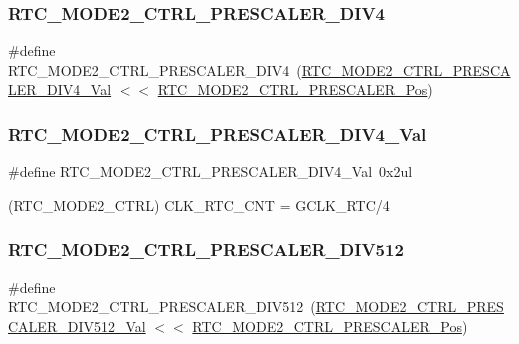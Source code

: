 \subsubsection{\texorpdfstring{RTC\_MODE2\_CTRL\_PRESCALER\_DIV4}{RTC\_MODE2\_CTRL\_PRESCALER\_DIV4}}
{\footnotesize\ttfamily \#define R\+T\+C\+\_\+\+M\+O\+D\+E2\+\_\+\+C\+T\+R\+L\+\_\+\+P\+R\+E\+S\+C\+A\+L\+E\+R\+\_\+\+D\+I\+V4~(\mbox{\hyperlink{group___s_a_m_d21___r_t_c_ga7075835115eb6138d8a729068575f7c8}{R\+T\+C\+\_\+\+M\+O\+D\+E2\+\_\+\+C\+T\+R\+L\+\_\+\+P\+R\+E\+S\+C\+A\+L\+E\+R\+\_\+\+D\+I\+V4\+\_\+\+Val}} $<$$<$ \mbox{\hyperlink{group___s_a_m_d21___r_t_c_gab49acaac9629f089845263f149b8a6c0}{R\+T\+C\+\_\+\+M\+O\+D\+E2\+\_\+\+C\+T\+R\+L\+\_\+\+P\+R\+E\+S\+C\+A\+L\+E\+R\+\_\+\+Pos}})}

\mbox{\label{group___s_a_m_d21___r_t_c_ga7075835115eb6138d8a729068575f7c8}} 
\subsubsection{\texorpdfstring{RTC\_MODE2\_CTRL\_PRESCALER\_DIV4\_Val}{RTC\_MODE2\_CTRL\_PRESCALER\_DIV4\_Val}}
{\footnotesize\ttfamily \#define R\+T\+C\+\_\+\+M\+O\+D\+E2\+\_\+\+C\+T\+R\+L\+\_\+\+P\+R\+E\+S\+C\+A\+L\+E\+R\+\_\+\+D\+I\+V4\+\_\+\+Val~0x2ul}



(R\+T\+C\+\_\+\+M\+O\+D\+E2\+\_\+\+C\+T\+RL) C\+L\+K\+\_\+\+R\+T\+C\+\_\+\+C\+NT = G\+C\+L\+K\+\_\+\+R\+T\+C/4 

\mbox{\label{group___s_a_m_d21___r_t_c_ga7ae90cb3eb6497c6e0c22c3269e2c83d}} 
\subsubsection{\texorpdfstring{RTC\_MODE2\_CTRL\_PRESCALER\_DIV512}{RTC\_MODE2\_CTRL\_PRESCALER\_DIV512}}
{\footnotesize\ttfamily \#define R\+T\+C\+\_\+\+M\+O\+D\+E2\+\_\+\+C\+T\+R\+L\+\_\+\+P\+R\+E\+S\+C\+A\+L\+E\+R\+\_\+\+D\+I\+V512~(\mbox{\hyperlink{group___s_a_m_d21___r_t_c_gaa38f16b6e6918d9161ec7ed48ec2e02c}{R\+T\+C\+\_\+\+M\+O\+D\+E2\+\_\+\+C\+T\+R\+L\+\_\+\+P\+R\+E\+S\+C\+A\+L\+E\+R\+\_\+\+D\+I\+V512\+\_\+\+Val}} $<$$<$ \mbox{\hyperlink{group___s_a_m_d21___r_t_c_gab49acaac9629f089845263f149b8a6c0}{R\+T\+C\+\_\+\+M\+O\+D\+E2\+\_\+\+C\+T\+R\+L\+\_\+\+P\+R\+E\+S\+C\+A\+L\+E\+R\+\_\+\+Pos}})}

